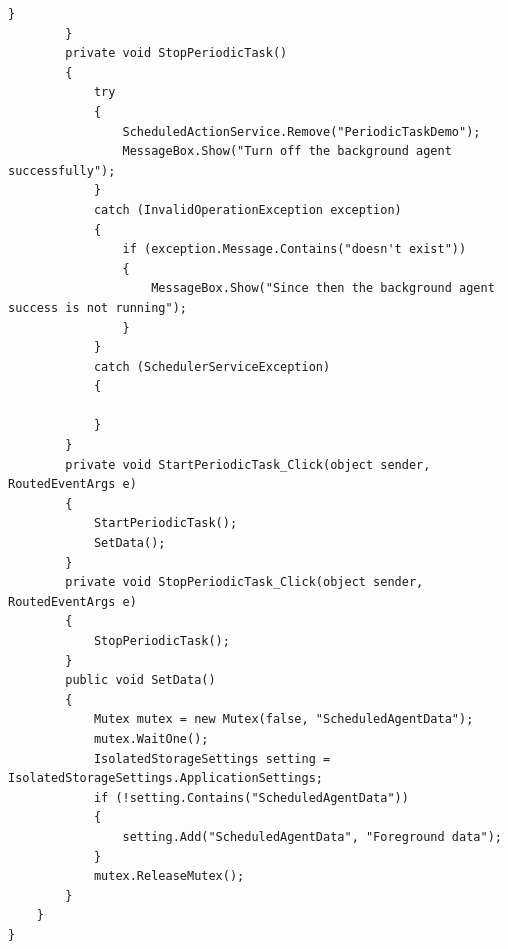 \documentclass[a4paper,10pt]{scrreprt}
\begin{document}
\begin{lstlisting}[caption=PeriodicTask in App]
            } 
        } 
        private void StopPeriodicTask() 
        { 
            try 
            { 
                ScheduledActionService.Remove("PeriodicTaskDemo"); 
                MessageBox.Show("Turn off the background agent successfully"); 
            } 
            catch (InvalidOperationException exception) 
            { 
                if (exception.Message.Contains("doesn't exist")) 
                { 
                    MessageBox.Show("Since then the background agent success is not running"); 
                } 
            } 
            catch (SchedulerServiceException) 
            { 
                  
            }  
        } 
        private void StartPeriodicTask_Click(object sender, RoutedEventArgs e) 
        { 
            StartPeriodicTask(); 
            SetData(); 
        } 
        private void StopPeriodicTask_Click(object sender, RoutedEventArgs e) 
        { 
            StopPeriodicTask(); 
        } 
        public void SetData() 
        { 
            Mutex mutex = new Mutex(false, "ScheduledAgentData"); 
            mutex.WaitOne(); 
            IsolatedStorageSettings setting = IsolatedStorageSettings.ApplicationSettings; 
            if (!setting.Contains("ScheduledAgentData")) 
            { 
                setting.Add("ScheduledAgentData", "Foreground data"); 
            } 
            mutex.ReleaseMutex(); 
        } 
    } 
}
\end{lstlisting}
\end{document}
